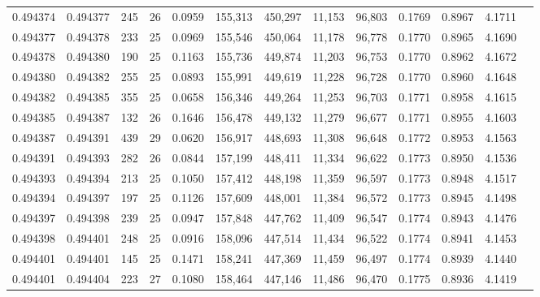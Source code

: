 \begin{tabular}{rrrrrrrrrrrrr}
0.494374 & 0.494377 & 245 &  26 &                                     0.0959 & 155,313 & 450,297 &  11,153 &  96,803 & 0.1769 & 0.8967 & 4.1711 \\
0.494377 & 0.494378 & 233 &  25 &                                     0.0969 & 155,546 & 450,064 &  11,178 &  96,778 & 0.1770 & 0.8965 & 4.1690 \\
0.494378 & 0.494380 & 190 &  25 &                                     0.1163 & 155,736 & 449,874 &  11,203 &  96,753 & 0.1770 & 0.8962 & 4.1672 \\
0.494380 & 0.494382 & 255 &  25 &                                     0.0893 & 155,991 & 449,619 &  11,228 &  96,728 & 0.1770 & 0.8960 & 4.1648 \\
0.494382 & 0.494385 & 355 &  25 &                                     0.0658 & 156,346 & 449,264 &  11,253 &  96,703 & 0.1771 & 0.8958 & 4.1615 \\
0.494385 & 0.494387 & 132 &  26 &                                     0.1646 & 156,478 & 449,132 &  11,279 &  96,677 & 0.1771 & 0.8955 & 4.1603 \\
0.494387 & 0.494391 & 439 &  29 &                                     0.0620 & 156,917 & 448,693 &  11,308 &  96,648 & 0.1772 & 0.8953 & 4.1563 \\
0.494391 & 0.494393 & 282 &  26 &                                     0.0844 & 157,199 & 448,411 &  11,334 &  96,622 & 0.1773 & 0.8950 & 4.1536 \\
0.494393 & 0.494394 & 213 &  25 &                                     0.1050 & 157,412 & 448,198 &  11,359 &  96,597 & 0.1773 & 0.8948 & 4.1517 \\
0.494394 & 0.494397 & 197 &  25 &                                     0.1126 & 157,609 & 448,001 &  11,384 &  96,572 & 0.1773 & 0.8945 & 4.1498 \\
0.494397 & 0.494398 & 239 &  25 &                                     0.0947 & 157,848 & 447,762 &  11,409 &  96,547 & 0.1774 & 0.8943 & 4.1476 \\
0.494398 & 0.494401 & 248 &  25 &                                     0.0916 & 158,096 & 447,514 &  11,434 &  96,522 & 0.1774 & 0.8941 & 4.1453 \\
0.494401 & 0.494401 & 145 &  25 &                                     0.1471 & 158,241 & 447,369 &  11,459 &  96,497 & 0.1774 & 0.8939 & 4.1440 \\
0.494401 & 0.494404 & 223 &  27 &                                     0.1080 & 158,464 & 447,146 &  11,486 &  96,470 & 0.1775 & 0.8936 & 4.1419 \\

\end{tabular}
